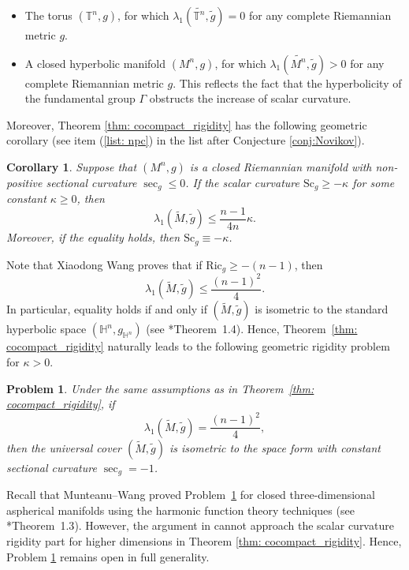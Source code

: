 \documentclass[12pt, reqno]{amsart}
\theoremstyle{plain}%
\newtheorem{corollary}[theorem]{Corollary}
\newtheorem{problem}[theorem]{Problem}
\theoremstyle{definition}
\theoremstyle{remark}
\numberwithin{equation}{section}
\newcommand{\Sc}{\mathrm{Sc}}
\newcommand{\Ric}{\mathrm{Ric}}
\begin{document}
\begin{itemize}
  \item The torus $(\mathbb{T}^n, g)$, for which $\lambda_1(\widetilde{\mathbb{T}^n}, \widetilde{g}) = 0$ for any complete Riemannian metric $g$.
  \item A closed hyperbolic manifold $(M^n, g)$, for which $\lambda_1(\widetilde{M^n}, \widetilde{g}) > 0$ for any complete Riemannian metric $g$. This reflects the fact that the hyperbolicity of the fundamental group $\Gamma$ obstructs the increase of scalar curvature.
\end{itemize}

\bigskip
Moreover, Theorem \ref{thm: cocompact_rigidity} has the following geometric corollary (see item (\ref{list: npc}) in the list after Conjecture \ref{conj:Novikov}).



\begin{corollary}
    Suppose that $(M^n,g)$ is a closed Riemannian manifold with non-positive sectional curvature $\sec_g \leq 0$. If the scalar curvature $\Sc_g \geq -\kappa$ for some constant $\kappa \geq  0$, then
    \begin{equation}
    \lambda_1(\widetilde{M}, \widetilde{g}) \leq \frac{n-1}{4n} \kappa.
    \end{equation}
    Moreover, if the equality holds, then $\Sc_g \equiv -\kappa$.
\end{corollary}

Note that Xiaodong Wang proves that if $\Ric_g \geq -(n-1)$, then
\[
    \lambda_1(\widetilde{M}, \widetilde{g}) \leq \frac{(n-1)^2}{4}.
\]
In particular, equality holds if and only if $(\widetilde{M}, \widetilde{g})$ is isometric to the standard hyperbolic space $(\mathbb{H}^n, g_{\mathbb{H}^n})$ (see \cite{Wang_eigenvalue}*{Theorem~1.4}). Hence, Theorem~\ref{thm: cocompact_rigidity} naturally leads to the following geometric rigidity problem for $\kappa > 0$.



\begin{problem} \label{conj: rigidity}
	Under the same assumptions as in Theorem~\ref{thm: cocompact_rigidity}, if
\[
    \lambda_1(\widetilde{M}, \widetilde{g}) = \frac{(n-1)^2}{4},
\]
then the universal cover $(\widetilde{M}, \widetilde{g})$ is isometric to the space form with constant sectional curvature $\sec_g = -1$.
\end{problem}
Recall that Munteanu--Wang proved Problem~\ref{conj: rigidity} for closed three-dimensional aspherical manifolds using the harmonic function theory techniques (see \cite{MunteanuWang}*{Theorem~1.3}). However, the argument in \cites{MunteanuWang} cannot approach the scalar curvature rigidity part for higher dimensions in Theorem \ref{thm: cocompact_rigidity}. Hence, Problem \ref{conj: rigidity} remains open in full generality.
\end{document}
